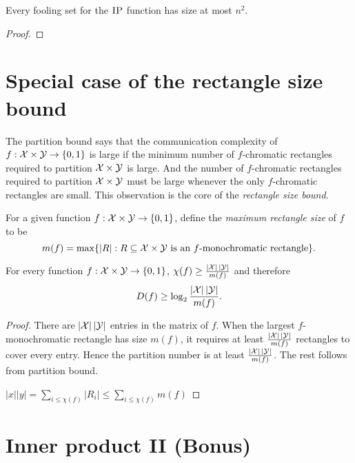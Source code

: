\begin{theorem}
Every fooling set for the $\textsc{IP}$ function has size at most $n^2$.
\end{theorem}

\begin{proof}
\end{proof}



\newpage \section{Special case of the rectangle size bound}

The partition bound says that the communication complexity of $f : \mathcal{X} \times \mathcal{Y} \to \{0,1\}$ is large if the minimum number of $f$-chromatic rectangles required to partition $\mathcal{X} \times \mathcal{Y}$ is large. And the number of $f$-chromatic rectangles required to partition $\mathcal{X} \times \mathcal{Y}$ must be large whenever the only $f$-chromatic rectangles are small. This observation is the core of the \emph{rectangle size bound}.

\begin{definition}[$m(f)$]
For a given function $f : \mathcal{X} \times \mathcal{Y} \to \{0,1\}$, define the \emph{maximum rectangle size} of $f$ to be
\[
m(f) = \max \{ |R| : R \subseteq \mathcal{X} \times \mathcal{Y} \mbox{ is an $f$-monochromatic rectangle} \}.
\]
\end{definition}


\begin{lemma}
For every function $f : \mathcal{X} \times \mathcal{Y} \to \{0,1\}$, $\chi(f) \ge \frac{|\mathcal{X}| \, |\mathcal{Y}|}{m(f)}$ and therefore
\[
D(f) \ge \log_2 \frac{|\mathcal{X}| \, |\mathcal{Y}|}{m(f)}.
\]
\end{lemma}

\begin{proof}
There are $|\mathcal{X}| \, |\mathcal{Y}|$ entries in the matrix of $f$. When the largest $f$-monochromatic rectangle has size $m(f)$, it requires at least $\frac{|\mathcal{X}| \, |\mathcal{Y}|}{m(f)}$ rectangles to cover every entry. Hence the partition number is at least $\frac{|\mathcal{X}| \, |\mathcal{Y}|}{m(f)}$. The rest follows from partition bound. 

$|x||y| = \sum_{i \le \chi(f)} |R_i| \le \sum_{i \le \chi(f)} m(f)$
\end{proof}



\newpage \section{Inner product II (Bonus)}


